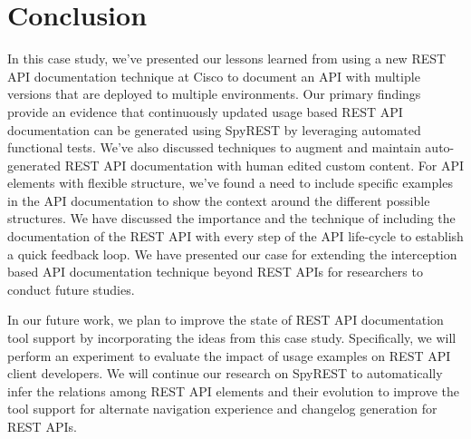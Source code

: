 \documentclass[10pt, conference]{IEEEtran}
\begin{document}
\section{Conclusion}
In this case study, we've presented our lessons learned from using a new REST API documentation technique at Cisco to document an API with multiple versions that are deployed to multiple environments. Our primary findings provide an evidence that continuously updated usage based REST API documentation can be generated using SpyREST by leveraging automated functional tests. We've also discussed techniques to augment and maintain auto-generated REST API documentation with human edited custom content. For API elements with flexible structure, we've found a need to include specific examples in the API documentation to show the context around the different possible structures. We have discussed the importance and the technique of including the documentation of the REST API with every step of the API life-cycle to establish a quick feedback loop. We have presented our case for extending the interception based API documentation technique beyond REST APIs for researchers to conduct future studies.

In our future work, we plan to improve the state of REST API documentation tool support by incorporating the ideas from this case study. Specifically, we will perform an experiment to evaluate the impact of usage examples on REST API client developers. We will continue our research on SpyREST to automatically infer the relations among REST API elements and their evolution to improve the tool support for alternate navigation experience and changelog generation for REST APIs.





%
%
\end{document}
